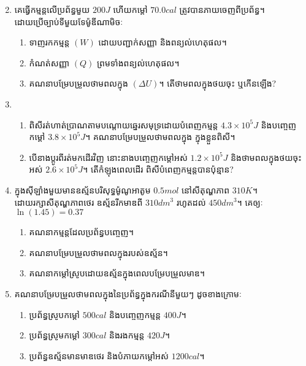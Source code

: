 \begin{enumerate}[m]
\begin{multicols}{2}
\begin{figure}[H]
		\end{figure}
	\end{multicols}
	\item គេធ្វើកម្មន្តលើប្រព័ន្ធមួយ $200J$ ហើយកម្តៅ $70.0cal$ ត្រូវបានភាយចេញពីប្រព័ន្ធ។ \\ដោយប្រើច្បាប់ទីមួយទែម៉ូឌីណាមិចៈ
	\begin{enumerate}[k]
		\item ទាញរកកម្មន្ត $\left(W\right)$ ដោយបញ្ជាក់សញ្ញា និងពន្យល់ហេតុផល។
		\item កំណត់សញ្ញា $\left(Q\right)$ ព្រមទាំងពន្យល់ហេតុផល។
		\item គណនាបម្រែបម្រួលថាមពលក្នុង $\left(\Delta U\right)$។ តើថាមពលក្នុងថយចុះ ឬកើនឡើង?
	\end{enumerate}
	\item \begin{enumerate}[k]
		\item ពិសីរត់ហាត់ប្រាណតាមបណ្តោយឆ្នេរសមុទ្រដោយបំពេញកម្មន្ត $4.3\times10^{5}J$ និងបញ្ចេញកម្តៅ $3.8\times10^{5}J$។ គណនាបម្រែបម្រួលថាមពលក្នុង ក្នុងខ្លួនពិសី។
		\item បើនាងប្តូរពីរត់មកដើរវិញ នោះនាងបញ្ចេញកម្តៅអស់ $1.2\times10^{5}J$ និងថាមពលក្នុងថយចុះអស់ $2.6\times10^{5}J$។ តើកំឡុងពេលដើរ ពិសីបំពេញកម្មន្តបានប៉ុន្មាន?
	\end{enumerate}
	\item ក្នុងសុីឡាំងមួយមានឧស្ម័នបរិសុទ្ធម៉ូណូអាតូម $0.5mol$ នៅសីតុណ្ហភាព $310K$។\\ ដោយរក្សាសីតុណ្ហភាពថេរ ឧស្ម័នរីកមាឌពី $310dm^{3}$ រហូតដល់ $450dm^{3}$។ គេឲ្យៈ $\ln\left(1.45\right)=0.37$
	\begin{enumerate}[k,2]
		\item គណនាកម្មន្តដែលប្រព័ន្ធបញ្ចេញ។
		\item គណនាបម្រែបម្រួលថាមពលក្នុងរបស់ឧស្ម័ន។
		\item គណនាកម្តៅស្រូបដោយឧស្ម័នក្នុងពេលបម្រែបម្រួលមាឌ។
	\end{enumerate}
	\item គណនាបម្រែបម្រួលថាមពលក្នុងនៃប្រព័ន្ធក្នុងករណីនីមួយៗ ដូចខាងក្រោមៈ
	\begin{enumerate}[k]
		\item ប្រព័ន្ធស្រូបកម្តៅ $500cal$ និងបញ្ចេញកម្មន្ត $400J$។
		\item ប្រព័ន្ធស្រូមកម្តៅ $300cal$ និងរងកម្មន្ត $420J$។
		\item ប្រព័ន្ធឧស្ម័នមានមាឌថេរ និងបំភាយកម្តៅអស់ $1200cal$។

\end{enumerate}
\end{enumerate}
